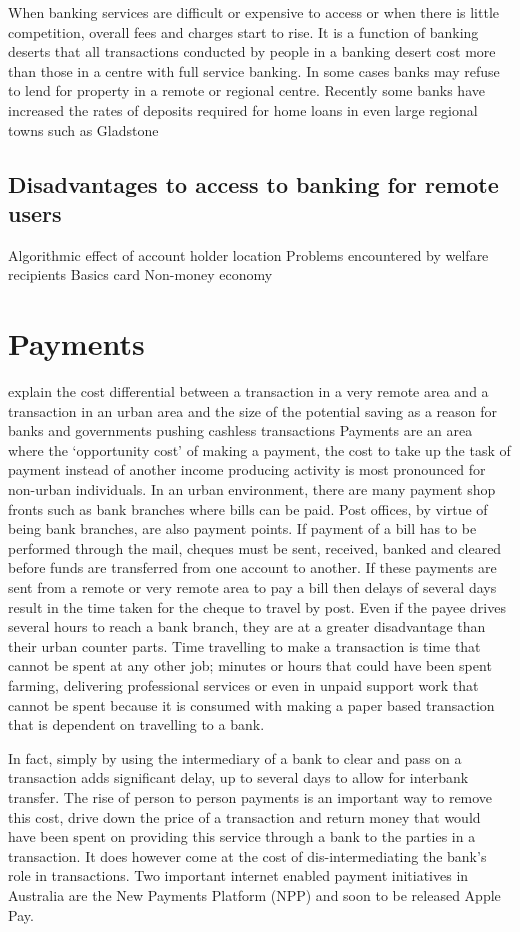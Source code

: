 When banking services are difficult or expensive to access or when there is little competition, overall fees and charges start to rise. It is a function of banking deserts that all transactions conducted by people in a banking desert cost more than those in a centre with full service banking. In some cases banks may refuse to lend for property in a remote or regional centre. Recently some banks have increased the rates of deposits required for home loans in even large regional towns such as Gladstone


\subsection{Disadvantages to access to banking for remote users}
Algorithmic effect of account holder location
Problems encountered by welfare recipients
Basics card
Non-money economy

\section{Payments}
{\color{red} explain the cost differential between a transaction in a very remote area and a transaction in an urban area and the size of the potential saving as a reason for banks and governments pushing cashless transactions}
Payments are an area where the `opportunity cost' of making a payment, the cost to take up the task of payment instead of another income producing activity is most pronounced for non-urban individuals. In an urban environment, there are many payment shop fronts such as bank branches where bills can be paid. Post offices, by virtue of being bank branches, are also payment points. If payment of a bill has to be performed through the mail, cheques must be sent, received, banked and cleared before funds are transferred from one account to another. If these payments are sent from a remote or very remote area to pay a bill then delays of several days result in the time taken for the cheque to travel by post. Even if the payee drives several hours to reach a bank branch, they are at a greater disadvantage than their urban counter parts. Time travelling to make a transaction is time that cannot be spent at any other job; minutes or hours that could have been spent farming, delivering professional services or even in unpaid support work that cannot be spent because it is consumed with making a paper based transaction that is dependent on travelling to a bank. 

In fact, simply by using the intermediary of a bank to clear and pass on a transaction adds significant delay, up to several days to allow for interbank transfer. The rise of person to person payments is an important way to remove this cost, drive down the price of a transaction and return money that would have been spent on providing this service through a bank to the parties in a transaction. It does however come at the cost of dis-intermediating the bank's role in transactions. Two important internet enabled payment initiatives in Australia are the New Payments Platform (NPP) and soon to be released Apple Pay.
 
